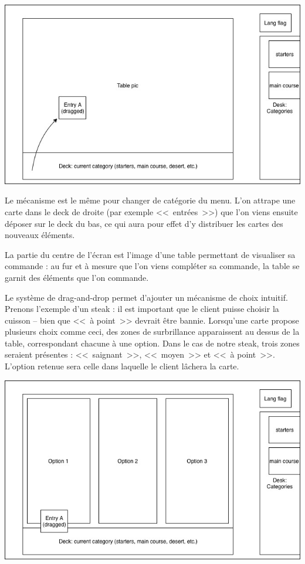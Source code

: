 \documentclass[a4paper,12pt]{article}
\begin{document}
\begin{center}
	\includegraphics[width=\textwidth]{in_place_drag.jpg}
\end{center}

Le mécanisme est le même pour changer de catégorie du menu. L'on attrape une carte dans le deck de droite (par
exemple <<~entrées~>>) que l'on viens ensuite déposer sur le deck du bas, ce qui aura pour effet d'y distribuer
les cartes des nouveaux éléments.

La partie du centre de l'écran est l'image d'une table permettant de visualiser sa commande : au fur et à mesure que
l'on viens compléter sa commande, la table se garnit des éléments que l'on commande.

Le système de drag-and-drop permet d'ajouter un mécanisme de choix intuitif. Prenons l'exemple d'un steak : il est
important que le client puisse choisir la cuisson -- bien que <<~à point~>> devrait être bannie. Lorsqu'une carte
propose plusieurs choix comme ceci, des zones de surbrillance apparaissent au dessus de la table, correspondant
chacune à une option. Dans le cas de notre steak, trois zones seraient présentes : <<~saignant~>>, <<~moyen~>> et
<<~à point~>>. L'option retenue sera celle dans laquelle le client lâchera la carte.

\begin{center}
	\includegraphics[width=\textwidth]{in_place_drag_options.jpg}
\end{center}
\end{document}
